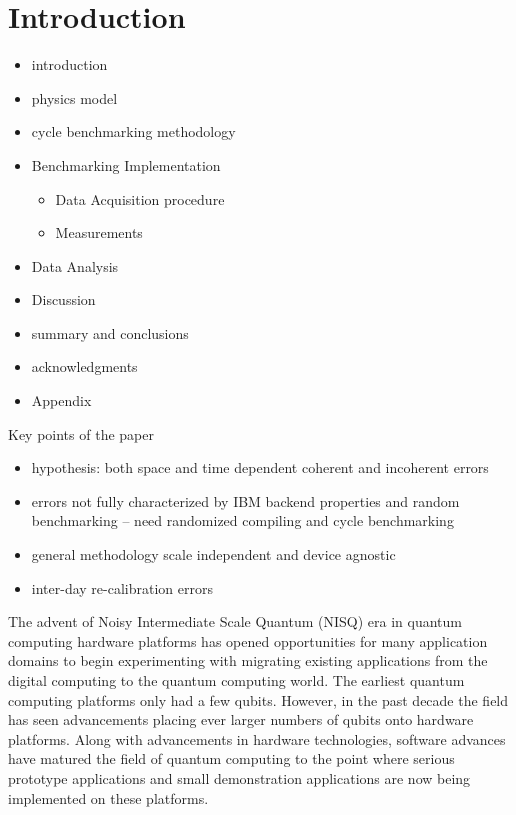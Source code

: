 

\section{Introduction}
\label{sec:intro}

\begin{itemize}
    \item introduction
\item physics model
\item cycle benchmarking methodology
\item Benchmarking Implementation
\begin{itemize}
    \item Data Acquisition procedure
    \item Measurements
\end{itemize}
\item Data Analysis
\item Discussion
\item summary and conclusions
\item acknowledgments
\item Appendix
\end{itemize}



Key points of the paper
\begin{itemize}
\item hypothesis: both space and time dependent coherent and incoherent errors
\item 	errors not fully characterized by IBM backend properties and random benchmarking – need randomized compiling and cycle benchmarking
\item  general methodology scale independent and device agnostic
\item inter-day re-calibration errors 
\end{itemize}

The advent of Noisy Intermediate Scale Quantum (NISQ) era in quantum computing hardware platforms has opened opportunities for many application domains to begin experimenting with migrating existing applications from the digital computing to the quantum computing world.  The earliest quantum computing platforms only had a few qubits.  However, in the past decade the field has seen advancements placing ever larger numbers of qubits onto hardware platforms.  Along with advancements in hardware technologies, software advances have matured the field of quantum computing to the point where serious prototype applications and small demonstration applications are now being implemented on these platforms.  

